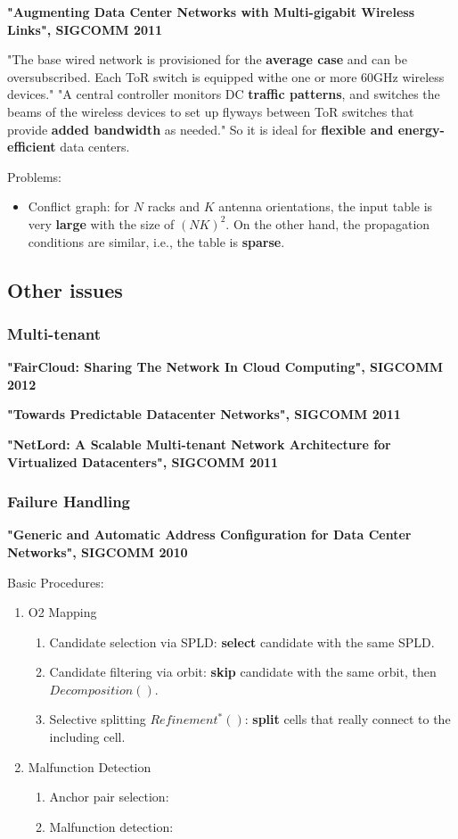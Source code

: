 \documentclass[journal,onecolumn,11pt]{IEEEtran}
\begin{document}
\textbf{"Augmenting Data Center Networks with Multi-gigabit Wireless Links", SIGCOMM 2011}

"The base wired network is provisioned for the \textbf{average case} and can be oversubscribed. Each ToR switch is equipped withe one or more 60GHz wireless devices." "A central controller monitors DC \textbf{traffic patterns}, and switches the beams of the wireless devices to set up flyways between ToR switches that provide \textbf{added bandwidth} as needed." So it is ideal for \textbf{flexible and energy-efficient} data centers.

Problems:
\begin{itemize}
  \item Conflict graph: for $N$ racks and $K$ antenna orientations, the input table is very \textbf{large} with the size of $(NK)^2$. On the other hand, the propagation conditions are similar, i.e., the table is \textbf{sparse}.
\end{itemize}

\subsection{Other issues}

\subsubsection{Multi-tenant}

\textbf{"FairCloud: Sharing The Network In Cloud Computing", SIGCOMM 2012}

\textbf{"Towards Predictable Datacenter Networks", SIGCOMM 2011}

\textbf{"NetLord: A Scalable Multi-tenant Network Architecture for Virtualized Datacenters", SIGCOMM 2011}

\subsubsection{Failure Handling}

\textbf{"Generic and Automatic Address Configuration for Data Center Networks", SIGCOMM 2010}

Basic Procedures:
\begin{enumerate}
  \item O2 Mapping
  \begin{enumerate}
    \item Candidate selection via SPLD: \textbf{select} candidate with the same SPLD.
    \item Candidate filtering via orbit: \textbf{skip} candidate with the same orbit, then $Decomposition()$.
    \item Selective splitting $Refinement^*()$: \textbf{split} cells that really connect to the including cell.
  \end{enumerate}
  \item Malfunction Detection
  \begin{enumerate}
    \item Anchor pair selection:
    \item Malfunction detection:
  \end{enumerate}
\end{enumerate}
\end{document}
